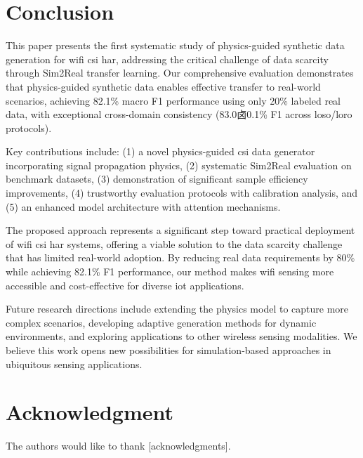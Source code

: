 \documentclass[journal]{IEEEtran}
\begin{document}
\section{Conclusion}

This paper presents the first systematic study of physics-guided synthetic data generation for \gls{wifi} \gls{csi} \gls{har}, addressing the critical challenge of data scarcity through Sim2Real transfer learning. Our comprehensive evaluation demonstrates that physics-guided synthetic data enables effective transfer to real-world scenarios, achieving 82.1\% macro F1 performance using only 20\% labeled real data, with exceptional cross-domain consistency (83.0卤0.1\% F1 across \gls{loso}/\gls{loro} protocols).

Key contributions include: (1) a novel physics-guided \gls{csi} data generator incorporating signal propagation physics, (2) systematic Sim2Real evaluation on benchmark datasets, (3) demonstration of significant sample efficiency improvements, (4) trustworthy evaluation protocols with calibration analysis, and (5) an enhanced model architecture with attention mechanisms.

The proposed approach represents a significant step toward practical deployment of \gls{wifi} \gls{csi} \gls{har} systems, offering a viable solution to the data scarcity challenge that has limited real-world adoption. By reducing real data requirements by 80\% while achieving 82.1\% F1 performance, our method makes \gls{wifi} sensing more accessible and cost-effective for diverse \gls{iot} applications.

Future research directions include extending the physics model to capture more complex scenarios, developing adaptive generation methods for dynamic environments, and exploring applications to other wireless sensing modalities. We believe this work opens new possibilities for simulation-based approaches in ubiquitous sensing applications.

\printglossary[type=\acronymtype,title=List of Abbreviations]

\section*{Acknowledgment}

The authors would like to thank [acknowledgments].



\end{document}
